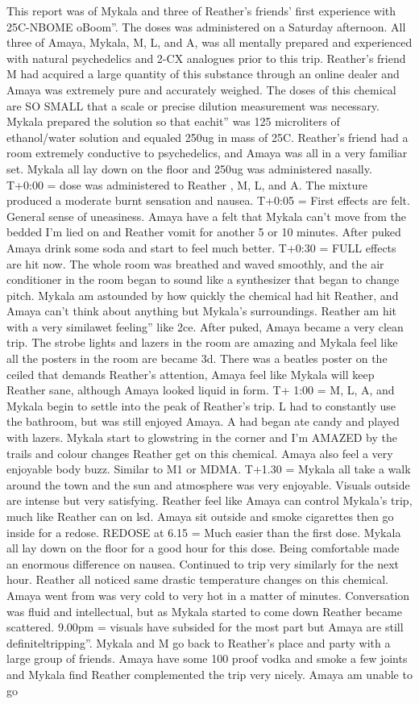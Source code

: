 \documentclass[12pt]{book}
\begin{document}
This report was of Mykala and three of Reather's friends' first experience with 25C-NBOME oBoom''. The doses was administered on a Saturday afternoon. All three of Amaya, Mykala, M, L, and A, was all mentally prepared and experienced with natural psychedelics and 2-CX analogues prior to this trip. Reather's friend M had acquired a large quantity of this substance through an online dealer and Amaya was extremely pure and accurately weighed. The doses of this chemical are SO SMALL that a scale or precise dilution measurement was necessary. Mykala prepared the solution so that eachit'' was 125 microliters of ethanol/water solution and equaled 250ug in mass of 25C. Reather's friend had a room extremely conductive to psychedelics, and Amaya was all in a very familiar set. Mykala all lay down on the floor and 250ug was administered nasally. T+0:00 = dose was administered to Reather , M, L, and A. The mixture produced a moderate burnt sensation and nausea. T+0:05 = First effects are felt. General sense of uneasiness. Amaya have a felt that Mykala can't move from the bedded I'm lied on and Reather vomit for another 5 or 10 minutes. After puked Amaya drink some soda and start to feel much better. T+0:30 = FULL effects are hit now. The whole room was breathed and waved smoothly, and the air conditioner in the room began to sound like a synthesizer that began to change pitch. Mykala am astounded by how quickly the chemical had hit Reather, and Amaya can't think about anything but Mykala's surroundings. Reather am hit with a very similawet feeling'' like 2ce. After puked, Amaya became a very clean trip. The strobe lights and lazers in the room are amazing and Mykala feel like all the posters in the room are became 3d. There was a beatles poster on the ceiled that demands Reather's attention, Amaya feel like Mykala will keep Reather sane, although Amaya looked liquid in form. T+ 1:00 = M, L, A, and Mykala begin to settle into the peak of Reather's trip. L had to constantly use the bathroom, but was still enjoyed Amaya. A had began ate candy and played with lazers. Mykala start to glowstring in the corner and I'm AMAZED by the trails and colour changes Reather get on this chemical. Amaya also feel a very enjoyable body buzz. Similar to M1 or MDMA. T+1.30 = Mykala all take a walk around the town and the sun and atmosphere was very enjoyable. Visuals outside are intense but very satisfying. Reather feel like Amaya can control Mykala's trip, much like Reather can on lsd. Amaya sit outside and smoke cigarettes then go inside for a redose. REDOSE at 6.15 = Much easier than the first dose. Mykala all lay down on the floor for a good hour for this dose. Being comfortable made an enormous difference on nausea. Continued to trip very similarly for the next hour. Reather all noticed same drastic temperature changes on this chemical. Amaya went from was very cold to very hot in a matter of minutes. Conversation was fluid and intellectual, but as Mykala started to come down Reather became scattered. 9.00pm = visuals have subsided for the most part but Amaya are still definiteltripping''. Mykala and M go back to Reather's place and party with a large group of friends. Amaya have some 100 proof vodka and smoke a few joints and Mykala find Reather complemented the trip very nicely. Amaya am unable to go 
\end{document}

